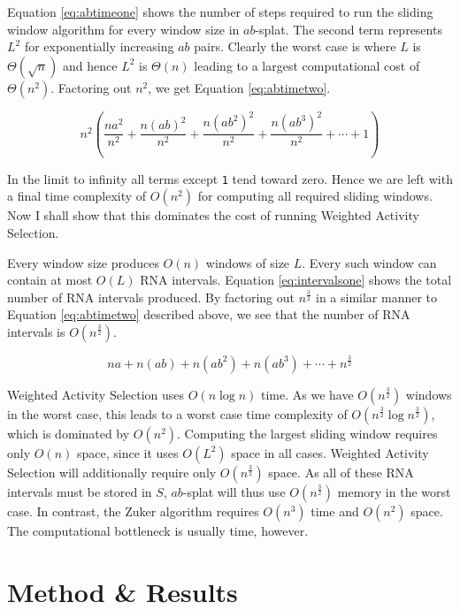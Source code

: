 \documentclass{cshonours}
\begin{document}
Equation \ref{eq:abtimeone} shows the number of steps required to run the sliding window algorithm for every window size in $ab$-splat. The second term represents $L^2$ for exponentially increasing $ab$ pairs. Clearly the worst case is where $L$ is $\Theta(\sqrt{n})$ and hence $L^2$ is $\Theta(n)$ leading to a largest computational cost of $\Theta(n^2)$. Factoring out $n^2$, we get Equation \ref{eq:abtimetwo}.

\begin{equation} \label{eq:abtimetwo}
	n^2 ( \frac{n a^2}{n^2} + \frac{n(a b)^2}{n^2} + \frac{n(a b^2)^2}{n^2} + \frac{n(a b^3)^2}{n^2} + \cdots + 1)
\end{equation}

In the limit to infinity all terms except \texttt{1} tend toward zero. Hence we are left with a final time complexity of $O(n^2)$ for computing all required sliding windows. Now I shall show that this dominates the cost of running Weighted Activity Selection.

Every window size produces $O(n)$ windows of size $L$. Every such window can contain at most $O(L)$ RNA intervals. Equation \ref{eq:intervalsone} shows the total number of RNA intervals produced. By factoring out $n^\frac{3}{2}$ in a similar manner to Equation \ref{eq:abtimetwo} described above, we see that the number of RNA intervals is $O(n^\frac{3}{2})$.


\begin{equation} \label{eq:intervalsone}
	n a + n(a b) + n(a b^2) + n(a b^3) + \cdots + n^\frac{3}{2}
\end{equation}

Weighted Activity Selection uses $O(n \log n)$ time. As we have $O(n^\frac{3}{2})$ windows in the worst case, this leads to a worst case time complexity of $O(n^\frac{3}{2} \log n^\frac{3}{2})$, which is dominated by $O(n^2)$. Computing the largest sliding window requires only $O(n)$ space, since it uses $O(L^2)$ space in all cases. Weighted Activity Selection will additionally require only $O(n^\frac{3}{2})$ space. As all of these RNA intervals must be stored in $S$, $ab$-splat will thus use $O(n^\frac{3}{2})$ memory in the worst case. In contrast, the Zuker algorithm requires $O(n^3)$ time and $O(n^2)$ space. The computational bottleneck is usually time, however. 


\chapter{Method \& Results}
\end{document}
